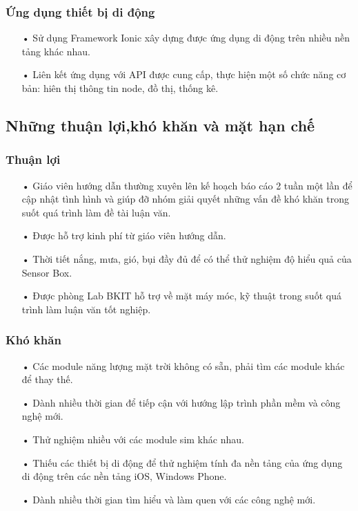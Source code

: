 \subsubsection*{Ứng dụng thiết bị di động}
\begin{itemize}
\item[•] Sử dụng Framework Ionic xây dựng được ứng dụng di động trên nhiều nền tảng khác nhau.
\item[•] Liên kết ứng dụng với API được cung cấp, thực hiện một số chức năng cơ bản: hiên thị thông tin node, đồ thị, thống kê.
\end{itemize}

\subsection{Những thuận lợi,khó khăn và mặt hạn chế}
\subsubsection*{Thuận lợi}
\begin{itemize}
\item[•] Giáo viên hướng dẫn thường xuyên lên kế hoạch báo cáo 2 tuần một lần để cập nhật tình hình và giúp đỡ nhóm giải quyết những vấn đề khó khăn trong suốt quá trình làm đề tài luận văn.
\item[•] Được hỗ trợ kinh phí từ giáo viên hướng dẫn.
\item[•] Thời tiết nắng, mưa, gió, bụi đầy đủ để có thể thử nghiệm độ hiểu quả của Sensor Box.
\item[•] Được phòng Lab BKIT hỗ trợ về mặt máy móc, kỹ thuật trong suốt quá trình làm luận văn tốt nghiệp.
\end{itemize}

\subsubsection*{Khó khăn}
\begin{itemize}
\item[•] Các module năng lượng mặt trời không có sẵn, phải tìm các module khác để thay thế.
\item[•] Dành nhiều thời gian để tiếp cận với hướng lập trình phần mềm và công nghệ mới.
\item[•] Thử nghiệm nhiều với các module sim khác nhau.
\item[•] Thiếu các thiết bị di động để thử nghiệm tính đa nền tảng của ứng dụng di động trên các nền tảng iOS, Windows Phone.
\item[•] Dành nhiều thời gian tìm hiểu và làm quen với các công nghệ mới.
\end{itemize}
